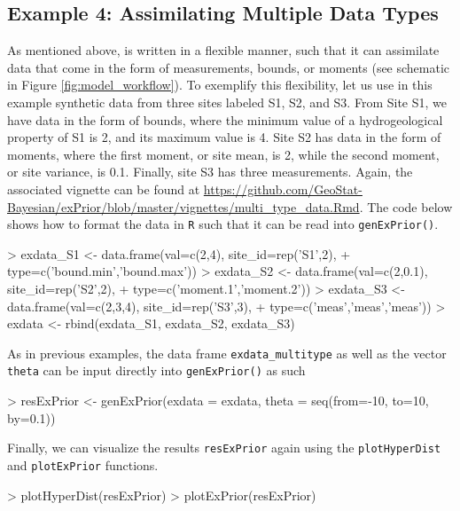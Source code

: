 \subsection{Example 4: Assimilating Multiple Data Types}\label{sec:multiple_data_types}

As mentioned above,  is written in a flexible manner, such that it can assimilate data that come in the form of measurements, bounds, or moments (see schematic in Figure \ref{fig:model_workflow}). 
To exemplify this flexibility, let us use in this example synthetic data from three sites labeled S1, S2, and S3. 
From Site S1, we have data in the form of bounds, where the minimum value of a hydrogeological property of S1 is 2, and its maximum value is 4. 
Site S2 has data in the form of moments, where the first moment, or site mean, is 2, while the second moment, or site variance, is 0.1. 
Finally, site S3 has three measurements.
Again, the associated vignette can be found at \url{https://github.com/GeoStat-Bayesian/exPrior/blob/master/vignettes/multi_type_data.Rmd}.
The code below shows how to format the data in \texttt{R} such that it can be read into \texttt{genExPrior()}.

\begin{example}
> exdata_S1 <- data.frame(val=c(2,4), site_id=rep('S1',2), 
+                         type=c('bound.min','bound.max'))
> exdata_S2 <- data.frame(val=c(2,0.1), site_id=rep('S2',2), 
+                         type=c('moment.1','moment.2'))
> exdata_S3 <- data.frame(val=c(2,3,4), site_id=rep('S3',3), 
+                         type=c('meas','meas','meas'))
> exdata <- rbind(exdata_S1, exdata_S2, exdata_S3)
\end{example}

As in previous examples, the data frame \texttt{exdata\_multitype} as well as the vector \texttt{theta} can be input directly into \texttt{genExPrior()} as such

\begin{example}
> resExPrior <- genExPrior(exdata = exdata, theta = seq(from=-10, to=10, by=0.1))
\end{example}

Finally, we can visualize the results \texttt{resExPrior} again using the \texttt{plotHyperDist} and \texttt{plotExPrior} functions.

\begin{example}
> plotHyperDist(resExPrior)
> plotExPrior(resExPrior)
\end{example}

